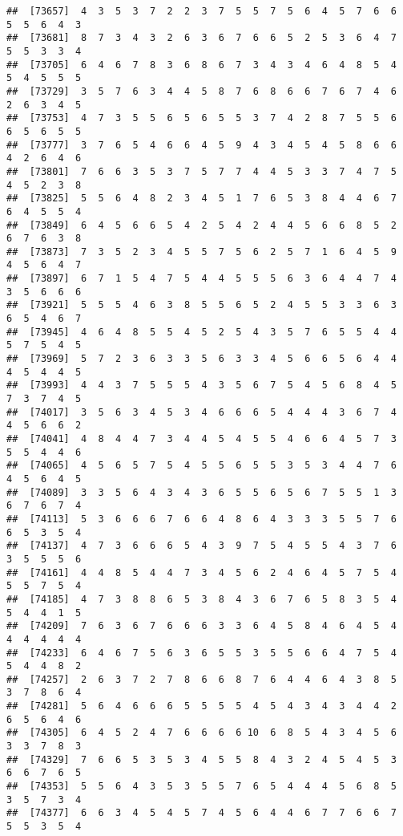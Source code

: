 \documentclass[
]{book}
\begin{document}
\begin{verbatim}
##  [73657]  4  3  5  3  7  2  2  3  7  5  5  7  5  6  4  5  7  6  6  5  5  6  4  3
##  [73681]  8  7  3  4  3  2  6  3  6  7  6  6  5  2  5  3  6  4  7  5  5  3  3  4
##  [73705]  6  4  6  7  8  3  6  8  6  7  3  4  3  4  6  4  8  5  4  5  4  5  5  5
##  [73729]  3  5  7  6  3  4  4  5  8  7  6  8  6  6  7  6  7  4  6  2  6  3  4  5
##  [73753]  4  7  3  5  5  6  5  6  5  5  3  7  4  2  8  7  5  5  6  6  5  6  5  5
##  [73777]  3  7  6  5  4  6  6  4  5  9  4  3  4  5  4  5  8  6  6  4  2  6  4  6
##  [73801]  7  6  6  3  5  3  7  5  7  7  4  4  5  3  3  7  4  7  5  4  5  2  3  8
##  [73825]  5  5  6  4  8  2  3  4  5  1  7  6  5  3  8  4  4  6  7  6  4  5  5  4
##  [73849]  6  4  5  6  6  5  4  2  5  4  2  4  4  5  6  6  8  5  2  6  7  6  3  8
##  [73873]  7  3  5  2  3  4  5  5  7  5  6  2  5  7  1  6  4  5  9  4  5  6  4  7
##  [73897]  6  7  1  5  4  7  5  4  4  5  5  5  6  3  6  4  4  7  4  3  5  6  6  6
##  [73921]  5  5  5  4  6  3  8  5  5  6  5  2  4  5  5  3  3  6  3  6  5  4  6  7
##  [73945]  4  6  4  8  5  5  4  5  2  5  4  3  5  7  6  5  5  4  4  5  7  5  4  5
##  [73969]  5  7  2  3  6  3  3  5  6  3  3  4  5  6  6  5  6  4  4  4  5  4  4  5
##  [73993]  4  4  3  7  5  5  5  4  3  5  6  7  5  4  5  6  8  4  5  7  3  7  4  5
##  [74017]  3  5  6  3  4  5  3  4  6  6  6  5  4  4  4  3  6  7  4  4  5  6  6  2
##  [74041]  4  8  4  4  7  3  4  4  5  4  5  5  4  6  6  4  5  7  3  5  5  4  4  6
##  [74065]  4  5  6  5  7  5  4  5  5  6  5  5  3  5  3  4  4  7  6  4  5  6  4  5
##  [74089]  3  3  5  6  4  3  4  3  6  5  5  6  5  6  7  5  5  1  3  6  7  6  7  4
##  [74113]  5  3  6  6  6  7  6  6  4  8  6  4  3  3  3  5  5  7  6  6  5  3  5  4
##  [74137]  4  7  3  6  6  6  5  4  3  9  7  5  4  5  5  4  3  7  6  3  5  5  5  6
##  [74161]  4  4  8  5  4  4  7  3  4  5  6  2  4  6  4  5  7  5  4  5  5  7  5  4
##  [74185]  4  7  3  8  8  6  5  3  8  4  3  6  7  6  5  8  3  5  4  5  4  4  1  5
##  [74209]  7  6  3  6  7  6  6  6  3  3  6  4  5  8  4  6  4  5  4  4  4  4  4  4
##  [74233]  6  4  6  7  5  6  3  6  5  5  3  5  5  6  6  4  7  5  4  5  4  4  8  2
##  [74257]  2  6  3  7  2  7  8  6  6  8  7  6  4  4  6  4  3  8  5  3  7  8  6  4
##  [74281]  5  6  4  6  6  6  5  5  5  5  4  5  4  3  4  3  4  4  2  6  5  6  4  6
##  [74305]  6  4  5  2  4  7  6  6  6  6 10  6  8  5  4  3  4  5  6  3  3  7  8  3
##  [74329]  7  6  6  5  3  5  3  4  5  5  8  4  3  2  4  5  4  5  3  6  6  7  6  5
##  [74353]  5  5  6  4  3  5  3  5  5  7  6  5  4  4  4  5  6  8  5  3  5  7  3  4
##  [74377]  6  6  3  4  5  4  5  7  4  5  6  4  4  6  7  7  6  6  7  5  5  3  5  4

\end{verbatim}
\end{document}
